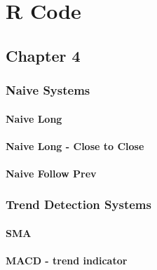 
\chapter{R Code} %

\label{AppendixA} %

\section{Chapter 4}

\subsection{Naive Systems}
\subsubsection{Naive Long}
\label{appA:NaiveLong}


\subsubsection{Naive Long - Close to Close}
\label{appA:NaiveLong_2}


\subsubsection{Naive Follow Prev}
\label{appA:NaiveFollowPrev}


\subsection{Trend Detection Systems}
\subsubsection{SMA}
\label{appA:SMA_sys}



\subsubsection{MACD - trend indicator}


\label{appA:macd_xo}

